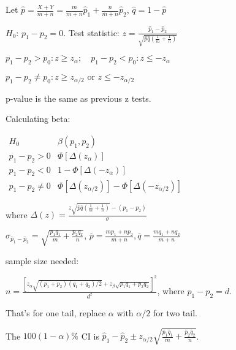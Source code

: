 \documentclass{article}
\begin{document}
	Let $\hat { p } = \frac { X + Y } { m + n } = \frac { m } { m + n } \hat { p } _ { 1 } + \frac { n } { m + n } \hat { p } _ { 2 }$, $\hat{q} = 1-\hat{p}$
	
	$H_0$: $p_1-p_2 = 0$. Test statistic: $z = \frac { \hat { p } _ { 1 } - \hat { p } _ { 2 } } { \sqrt { \hat { p } \hat { q } \left( \frac { 1 } { m } + \frac { 1 } { n } \right) } }$
	
	
	$
	{ p_1 - p_2 > p _ { 0 } } : z \geq z_\alpha ;\quad
	{ p_1 - p_2 < p _ { 0 } } : z \leq -z_\alpha 
	$
	
	$
	{ p_1 - p_2 \neq p _ { 0 } } : z \geq z_{\alpha/2} \text{ or } z\leq-z_{\alpha/2}
	$
	
	
	p-value is the same as previous z tests.

	
	Calculating beta:
	
	\centerline{
		$
		\begin{array}{cc}
		H_0&\beta(p_1,p_2)\\
		p_1-p_2>0 & \Phi\left[\Delta(z_\alpha)\right] \\
		p_1-p_2<0 & 1- \Phi \left[ \Delta(-z_\alpha) \right]\\
		p_1-p_2\neq 0 & \Phi \left[ \Delta(z_{\alpha/2}) \right] - \Phi \left[ \Delta(-z_{\alpha/2}) \right]
		\end{array}
		$
	}
	
	where $\Delta(z) = \frac{z \sqrt{\bar{ p }\bar{ q }\left(\frac{1}{m}+\frac{1}{n}\right)} - (p_1-p_2) }{\sigma}$
	
	$\sigma _ { \hat { p } _ { 1 } - \hat { p } _ { 2 } } = \sqrt { \frac { p _ { 1 } q _ { 1 } } { m } + \frac { p _ { 2 } q _ { 2 } } { n } }$, $\overline { p } = \frac{ m p _ { 1 } + n p _ { 2 } } { m + n }, \overline { q } = \frac{ m q _ { 1 } + n q _ { 2 }}  { m + n }$
	
	
	
	sample size needed: 
	
	$n = \frac { \left[ z _ { \alpha } \sqrt { \left( p _ { 1 } + p _ { 2 } \right) \left( q _ { 1 } + q _ { 2 } \right) / 2 } + z _ { \beta } \sqrt { p _ { 1 } q _ { 1 } + p _ { 2 } q _ { 2 } } \right] ^ { 2 } } { d ^ { 2 } }$, where $p_1-p_2 = d$.
	
	That's for one tail, replace $\alpha$ with $\alpha/2$ for two tail.
	
	The $100(1-\alpha)\%$ CI is $\hat { p } _ { 1 } - \hat { p } _ { 2 } \pm z _ { \alpha / 2 } \sqrt { \frac { \hat { p } _ { 1 } \hat { q } _ { 1 } } { m } + \frac { \hat { p } _ { 2 } \hat { q } _ { 2 } } { n } }$.
	
\end{document}
